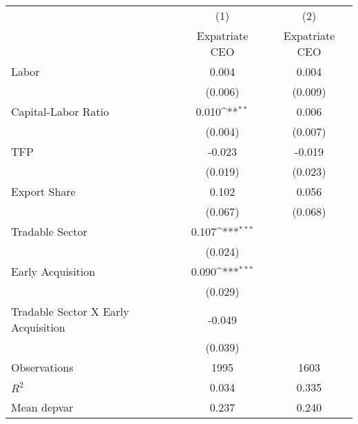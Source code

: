 {
\def\sym#1{\ifmmode^{#1}\else\(^{#1}\)\fi}
\begin{tabular}{l*{2}{c}}
\hline\hline
                    &\multicolumn{1}{c}{(1)}&\multicolumn{1}{c}{(2)}\\
                    &\multicolumn{1}{c}{Expatriate CEO}&\multicolumn{1}{c}{Expatriate CEO}\\
\hline
Labor               &       0.004         &       0.004         \\
                    &     (0.006)         &     (0.009)         \\
[1em]
Capital-Labor Ratio &       0.010\sym{**} &       0.006         \\
                    &     (0.004)         &     (0.007)         \\
[1em]
TFP                 &      -0.023         &      -0.019         \\
                    &     (0.019)         &     (0.023)         \\
[1em]
Export Share        &       0.102         &       0.056         \\
                    &     (0.067)         &     (0.068)         \\
[1em]
Tradable Sector     &       0.107\sym{***}&                     \\
                    &     (0.024)         &                     \\
[1em]
Early Acquisition   &       0.090\sym{***}&                     \\
                    &     (0.029)         &                     \\
[1em]
Tradable Sector X Early Acquisition&      -0.049         &                     \\
                    &     (0.039)         &                     \\
\hline
Observations        &        1995         &        1603         \\
\(R^{2}\)           &       0.034         &       0.335         \\
Mean depvar         &       0.237         &       0.240         \\
\hline\hline
\end{tabular}
}
